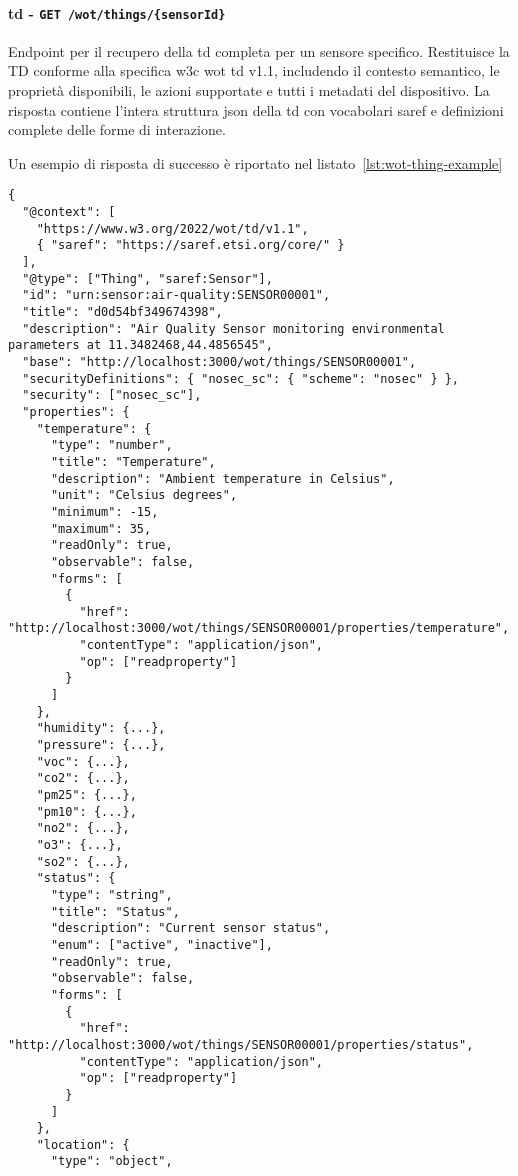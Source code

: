 \paragraph{\acrlong{td} - \texttt{GET /wot/things/\{sensorId\}}}

Endpoint per il recupero della \acrlong{td} completa per un sensore specifico.
Restituisce la TD conforme alla specifica \acrshort{w3c} \acrshort{wot} \acrshort{td} v1.1, includendo il contesto
semantico, le proprietà disponibili, le azioni supportate e tutti i metadati del dispositivo.
La risposta contiene l'intera struttura \acrshort{json} della \acrlong{td} con vocabolari \acrlong{saref} e definizioni
complete delle forme di interazione.

Un esempio di risposta di successo è riportato nel listato~\ref{lst:wot-thing-example}
\begin{lstlisting}[caption={Risposta di successo per endpoint \texttt{/wot/things/{sensorId}}}, label=lst:wot-thing-example]
{
  "@context": [
    "https://www.w3.org/2022/wot/td/v1.1",
    { "saref": "https://saref.etsi.org/core/" }
  ],
  "@type": ["Thing", "saref:Sensor"],
  "id": "urn:sensor:air-quality:SENSOR00001",
  "title": "d0d54bf349674398",
  "description": "Air Quality Sensor monitoring environmental parameters at 11.3482468,44.4856545",
  "base": "http://localhost:3000/wot/things/SENSOR00001",
  "securityDefinitions": { "nosec_sc": { "scheme": "nosec" } },
  "security": ["nosec_sc"],
  "properties": {
    "temperature": {
      "type": "number",
      "title": "Temperature",
      "description": "Ambient temperature in Celsius",
      "unit": "Celsius degrees",
      "minimum": -15,
      "maximum": 35,
      "readOnly": true,
      "observable": false,
      "forms": [
        {
          "href": "http://localhost:3000/wot/things/SENSOR00001/properties/temperature",
          "contentType": "application/json",
          "op": ["readproperty"]
        }
      ]
    },
    "humidity": {...},
    "pressure": {...},
    "voc": {...},
    "co2": {...},
    "pm25": {...},
    "pm10": {...},
    "no2": {...},
    "o3": {...},
    "so2": {...},
    "status": {
      "type": "string",
      "title": "Status",
      "description": "Current sensor status",
      "enum": ["active", "inactive"],
      "readOnly": true,
      "observable": false,
      "forms": [
        {
          "href": "http://localhost:3000/wot/things/SENSOR00001/properties/status",
          "contentType": "application/json",
          "op": ["readproperty"]
        }
      ]
    },
    "location": {
      "type": "object",

\end{lstlisting}

